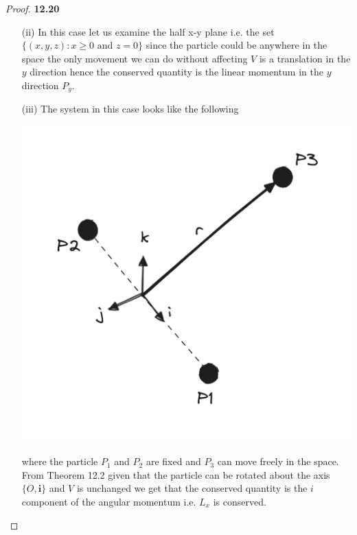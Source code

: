 \documentclass[11pt]{article}
\theoremstyle{definition}
\begin{document}
\begin{proof}{\textbf{12.20}}
\begin{itemize}
    \item [(ii)] In this case let us examine the half x-y plane i.e. the set
    $\{(x,y,z) : x\geq 0 \text{ and } z=0\}$ since the particle could be
    anywhere in the space the only movement we can do without affecting $V$
    is a translation in the $y$ direction hence the conserved quantity is the
    linear momentum in the $y$ direction $P_y$. 
    \cleardoublepage
    \item [(iii)]
    The system in this case looks like the following
    \begin{center}
        \includegraphics[scale=0.4]{ch12-20-iii.png}
    \end{center}
    where the particle $P_1$ and $P_2$ are fixed and $P_3$ can move freely in
    the space.
    From Theorem 12.2 given that the particle can be rotated about the axis
    $\{O,\bm{i}\}$ and $V$ is unchanged we get
    that the conserved quantity is the $i$ component of the angular momentum
    i.e. $L_x$ is conserved.
    

\end{itemize}
\end{proof}
\end{document}
